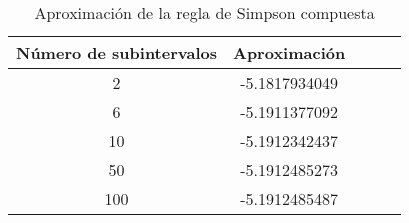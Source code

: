 \begin{table}[h]
  \begin{center}
    \begin{tabular}{|c|c|c|c|c|} \hline 
      \textbf{N\'umero de subintervalos} & \textbf{Aproximaci\'on} \\ 
      \hline
      2 & -5.1817934049 \\
      \hline
      6 & -5.1911377092 \\
      \hline
      10 & -5.1912342437 \\
      \hline
      50 & -5.1912485273 \\
      \hline
      100 & -5.1912485487 \\
      \hline
    \end{tabular}
  \end{center}
  \caption{Aproximaci\'on de la regla de Simpson compuesta}
  \label{tab:2}
\end{table}

